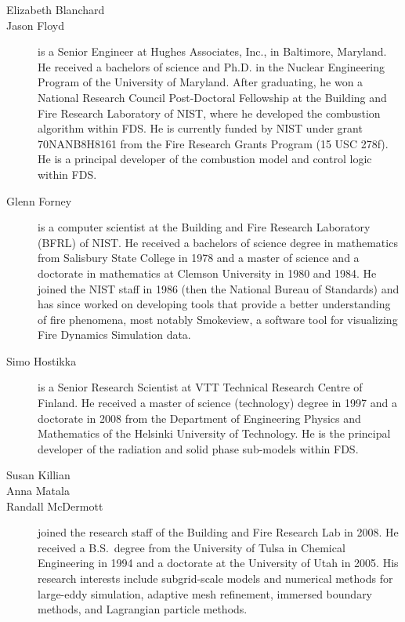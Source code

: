 \begin{description}

\item[Elizabeth Blanchard]

\item[Jason Floyd] is a Senior Engineer at Hughes Associates, Inc., in Baltimore, Maryland. He received a bachelors of science and Ph.D. in the Nuclear Engineering Program of the University of Maryland. After graduating, he won a National Research Council Post-Doctoral Fellowship at the Building and Fire Research Laboratory of NIST, where he developed the combustion algorithm within FDS. He is currently funded by NIST under grant 70NANB8H8161 from the Fire Research Grants Program (15 USC 278f). He is a principal developer of the combustion model and control logic within FDS.

\item[Glenn Forney] is a computer scientist at the Building and Fire Research Laboratory (BFRL) of NIST. He received a bachelors of science degree in mathematics from Salisbury State College in 1978 and a master of science and a doctorate in mathematics at Clemson University in 1980 and 1984.  He joined the NIST staff in 1986 (then the National Bureau of Standards) and has since worked on developing tools that provide a better understanding of fire phenomena, most notably Smokeview, a software tool for visualizing Fire Dynamics Simulation data.

\item[Simo Hostikka] is a Senior Research Scientist at VTT Technical Research Centre of Finland. He received a master of science (technology) degree in 1997 and a doctorate in 2008 from the Department of Engineering Physics and Mathematics of the Helsinki University of Technology.  He is the principal developer of the radiation and solid phase sub-models within FDS.

\item[Susan Killian]

\item[Anna Matala]

\item[Randall McDermott] joined the research staff of the Building and Fire Research Lab in 2008. He received a B.S.~degree from the University of Tulsa in Chemical Engineering in 1994 and a doctorate at the University of Utah in 2005. His research interests include subgrid-scale models and numerical methods for large-eddy simulation, adaptive mesh refinement, immersed boundary methods, and Lagrangian particle methods.


\end{description}
